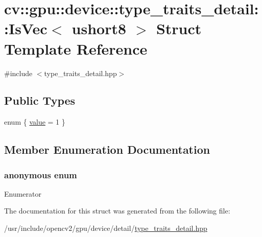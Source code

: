 \hypertarget{structcv_1_1gpu_1_1device_1_1type__traits__detail_1_1IsVec_3_01ushort8_01_4}{\section{cv\-:\-:gpu\-:\-:device\-:\-:type\-\_\-traits\-\_\-detail\-:\-:Is\-Vec$<$ ushort8 $>$ Struct Template Reference}
\label{structcv_1_1gpu_1_1device_1_1type__traits__detail_1_1IsVec_3_01ushort8_01_4}
}


{\ttfamily \#include $<$type\-\_\-traits\-\_\-detail.\-hpp$>$}

\subsection*{Public Types}
\begin{DoxyCompactItemize}
\item 
enum \{ \hyperlink{structcv_1_1gpu_1_1device_1_1type__traits__detail_1_1IsVec_3_01ushort8_01_4_a5c9dbf46f6b101be81b0ae83dc28c657a934b53596a49a0b75d110eecc1b3b336}{value} = 1
 \}
\end{DoxyCompactItemize}


\subsection{Member Enumeration Documentation}
\hypertarget{structcv_1_1gpu_1_1device_1_1type__traits__detail_1_1IsVec_3_01ushort8_01_4_a5c9dbf46f6b101be81b0ae83dc28c657}{\subsubsection[{anonymous enum}]{\setlength{\rightskip}{0pt plus 5cm}anonymous enum}}\label{structcv_1_1gpu_1_1device_1_1type__traits__detail_1_1IsVec_3_01ushort8_01_4_a5c9dbf46f6b101be81b0ae83dc28c657}
\begin{Desc}
\item[Enumerator]\par
\begin{description}
\item[{\em 
\hypertarget{structcv_1_1gpu_1_1device_1_1type__traits__detail_1_1IsVec_3_01ushort8_01_4_a5c9dbf46f6b101be81b0ae83dc28c657a934b53596a49a0b75d110eecc1b3b336}{value}\label{structcv_1_1gpu_1_1device_1_1type__traits__detail_1_1IsVec_3_01ushort8_01_4_a5c9dbf46f6b101be81b0ae83dc28c657a934b53596a49a0b75d110eecc1b3b336}
}]\end{description}
\end{Desc}


The documentation for this struct was generated from the following file\-:\begin{DoxyCompactItemize}
\item 
/usr/include/opencv2/gpu/device/detail/\hyperlink{type__traits__detail_8hpp}{type\-\_\-traits\-\_\-detail.\-hpp}\end{DoxyCompactItemize}
